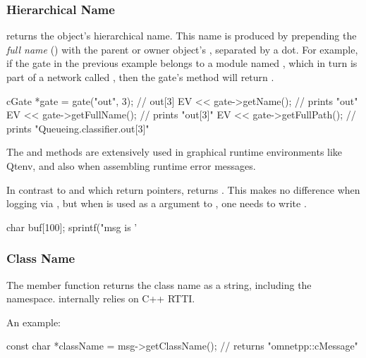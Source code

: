 \subsubsection{Hierarchical Name}
\label{sec:sim-lib:object-fullpath}

 returns the object's hierarchical name. This name is
produced by prepending the \textit{full name} () with
the parent or owner object's , separated by a dot. For
example, if the  gate in the previous example belongs to a
module named , which in turn is part of a network called
, then the gate's  method will return
.

\begin{cpp}
cGate *gate = gate("out", 3);  // out[3]
EV << gate->getName();  // prints "out"
EV << gate->getFullName();  // prints "out[3]"
EV << gate->getFullPath();  // prints "Queueing.classifier.out[3]"
\end{cpp}

The  and  methods are
extensively used in graphical runtime environments like Qtenv,
and also when assembling runtime error messages.

In contrast to  and  which return
 pointers,  returns
. This makes no difference when logging via ,
but when  is used as a  argument to
, one needs to write .

\begin{cpp}
char buf[100];
sprintf("msg is '%
\end{cpp}


\subsubsection{Class Name}
\label{sec:sim-lib:classname}

The  member function returns the class
name as a string, including the namespace.  internally
relies on C++ RTTI.

An example:

\begin{cpp}
const char *className = msg->getClassName(); // returns "omnetpp::cMessage"
\end{cpp}

